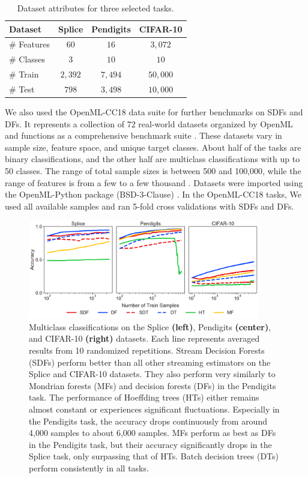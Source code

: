 \begin{table}[htb]
\centering
\begin{tabular}{lccc} 
\hline
Dataset & \textbf{Splice} & \textbf{Pendigits} & \textbf{CIFAR-10} \\
\hline
\# Features & $60$ & $16$ & $3,072$ \\
\hline
\# Classes & $3$ & $10$ & $10$ \\
\hline
\# Train & $2,392$ & $7,494$ & $50,000$ \\
\hline
\# Test & $798$ & $3,498$ & $10,000$ \\
\hline
\end{tabular}
\caption{Dataset attributes for three selected tasks.}
\label{table:data}
\end{table}

We also used the OpenML-CC18 data suite for further benchmarks on SDFs and DFs. It represents a collection of 72 real-world datasets organized by OpenML and functions as a comprehensive benchmark suite \citep{vanschoren_openml_2013, bischl_openml_2019}. These datasets vary in sample size, feature space, and unique target classes.
About half of the tasks are binary classifications, and the other half are multiclass classifications with up to 50 classes. The range of total sample sizes is between 500 and 100,000, while the range of features is from a few to a few thousand \citep{bischl_openml_2019}.
Datasets were imported using the OpenML-Python package (BSD-3-Clause) \citep{feurer_openml-python_2019}. In the OpenML-CC18 tasks, We used all available samples and ran 5-fold cross validations with SDFs and DFs.

\begin{figure}[!htb]
\centering
\includegraphics[width=0.9\textwidth]{select_acc}
  \caption{Multiclass classifications on the Splice \textbf{(left)}, Pendigits \textbf{(center)}, and CIFAR-10 \textbf{(right)} datasets. 
  Each line represents averaged results from 10 randomized repetitions. Stream Decision Forests (SDFs) perform better than all other streaming estimators on the Splice and CIFAR-10 datasets. They also perform very similarly to Mondrian forests (MFs) and decision forests (DFs) in the Pendigits task. The performance of Hoeffding trees (HTs) either remains almost constant or experiences significant fluctuations. Especially in the Pendigits task, the accuracy drops continuously from around 4,000 samples to about 6,000 samples. MFs perform as best as DFs in the Pendigits task, but their accuracy significantly drops in the Splice task, only surpassing that of HTs. Batch decision trees (DTs) perform consistently in all tasks.
  }
\label{fig:select_acc}
\end{figure}

